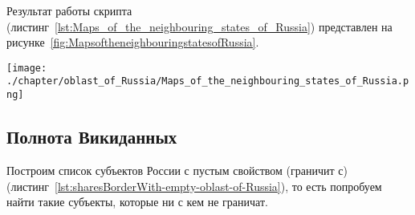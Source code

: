 Результат работы скрипта (листинг~\ref{lst:Maps_of_the_neighbouring_states_of_Russia}) представлен на рисунке~\ref{fig:MapsoftheneighbouringstatesofRussia}.

\begin{fullwidth}
\begin{figure*}[h]
	\texttt{[image: ./chapter/oblast\_of\_Russia/Maps\_of\_the\_neighbouring\_states\_of\_Russia.png]}
	\caption[Карта зарубежных стран, граничащих с субъектами России, 2021.]{Карта зарубежных стран, граничащих с субъектами России, 2021. Карта построена на основе данных, полученных с помощью запроса~\protect\ref{lst:Maps_of_the_neighbouring_states_of_Russia}.}%
      \label{fig:MapsoftheneighbouringstatesofRussia}%
\end{figure*} 
\end{fullwidth}

\newpage
\subsection{Полнота Викиданных}

Построим список субъектов России с пустым свойством  (граничит с) (листинг~\ref{lst:sharesBorderWith-empty-oblast-of-Russia}), то есть попробуем найти такие субъекты, которые ни с кем не граничат.

\label{question:q_subjects_of_Russia_2}

